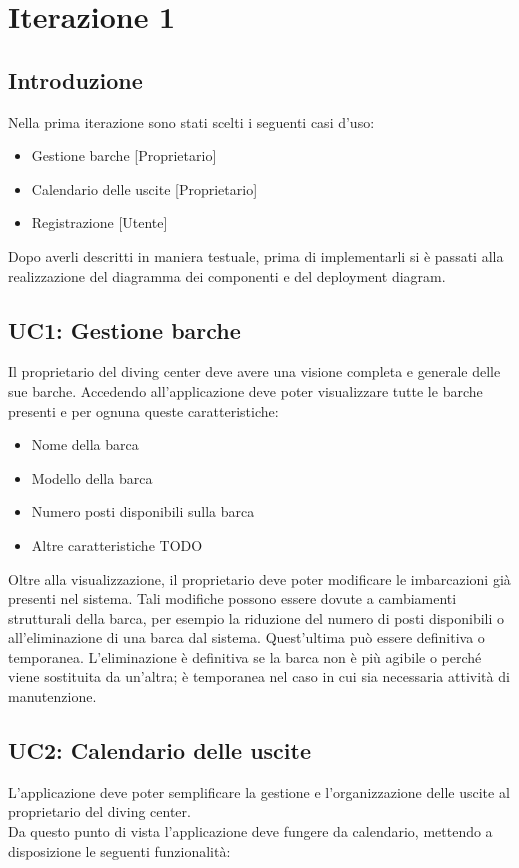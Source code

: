 \chapter{Iterazione 1}

\section{Introduzione}
Nella prima iterazione sono stati scelti i seguenti casi d'uso:

\begin{itemize}
    \item Gestione barche [Proprietario]
    \item Calendario delle uscite [Proprietario]
    \item Registrazione [Utente]
\end{itemize}
Dopo averli descritti in maniera testuale, prima di implementarli si è passati alla realizzazione del diagramma dei componenti e del deployment diagram.

\section{UC1: Gestione barche}
Il proprietario del diving center deve avere una visione completa e generale delle sue barche.
Accedendo all'applicazione deve poter visualizzare tutte le barche presenti e per ognuna queste caratteristiche:

\begin{itemize}
    \item Nome della barca
    \item Modello della barca
    \item Numero posti disponibili sulla barca
    \item Altre caratteristiche TODO
\end{itemize}

Oltre alla visualizzazione, il proprietario deve poter modificare le imbarcazioni già presenti nel sistema.
Tali modifiche possono essere dovute a cambiamenti strutturali della barca, per esempio la riduzione del numero di posti disponibili
o all'eliminazione di una barca dal sistema.
Quest'ultima può essere definitiva o temporanea. L'eliminazione è definitiva se la barca non è più agibile o perché viene sostituita da un'altra;
è temporanea nel caso in cui sia necessaria attività di manutenzione.

\section{UC2: Calendario delle uscite}
L'applicazione deve poter semplificare la gestione e l'organizzazione delle uscite al proprietario del diving center.
\\Da questo punto di vista l'applicazione deve fungere da calendario, mettendo a disposizione le seguenti funzionalità:

